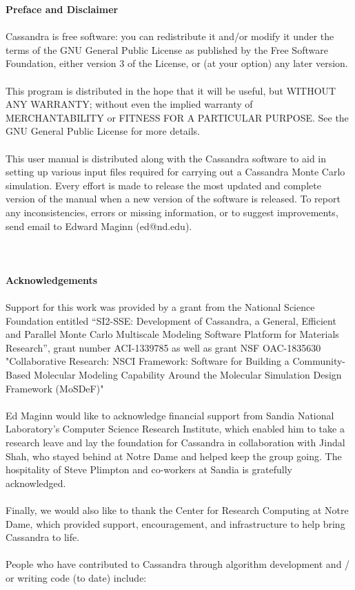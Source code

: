 {\huge \bf{Preface and Disclaimer}} \\ \\
%
Cassandra is free software: you can redistribute it and/or modify
it under the terms of the GNU General Public License as published by
the Free Software Foundation, either version 3 of the License, or
 (at your option) any later version. \\ \\
 This program is distributed in the hope that it will be useful,
 but WITHOUT ANY WARRANTY; without even the implied warranty of
MERCHANTABILITY or FITNESS FOR A PARTICULAR PURPOSE.  See the
GNU General Public License for more details.  \\ \\
%
This user manual is distributed along with the Cassandra software to
aid in setting up various input files required for carrying out a Cassandra
Monte Carlo simulation. Every effort is made to release the most
updated and complete version of the manual when a new version of the
software is released. To report any inconsistencies, errors or missing
information, or to suggest improvements, send email to Edward Maginn
(ed@nd.edu). \\ \\  
%
\pagebreak
\\ \\
{\huge \bf{Acknowledgements}} \\ \\
Support for this work was provided by a grant from the National Science Foundation entitled ``SI2-SSE: Development of Cassandra, a General, Efficient and Parallel Monte Carlo Multiscale Modeling Software Platform for Materials Research'', grant number ACI-1339785 as well as grant  NSF OAC-1835630 "Collaborative Research: NSCI Framework: Software for Building a Community-Based Molecular Modeling Capability Around the Molecular Simulation Design Framework (MoSDeF)"		
\\ \\
Ed Maginn would like to acknowledge financial support from Sandia National Laboratory's Computer Science Research Institute, which enabled him to take a research leave and lay the foundation for Cassandra in collaboration with Jindal Shah, who stayed behind at Notre Dame and helped keep the group going. The hospitality of Steve Plimpton and co-workers at Sandia is gratefully acknowledged. 
\\ \\ 
Finally, we would also like to thank the Center for Research Computing at Notre Dame, which provided support, encouragement, and infrastructure to help bring Cassandra to life.
\\ \\
People who have contributed to Cassandra through algorithm development and / or writing code (to date) include:

